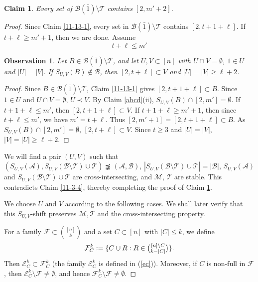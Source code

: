 \documentclass[10pt,a4paper]{amsart}
\newtheorem{claim}{Claim}
\newtheorem{obser}{Observation}
\def\andrey#1{{\sc Andrey: }{\marrow\sf \textcolor{blue}{#1}}}
\newcommand{\m}{\mathcal}
\def\marrow{{\boldmath {\marginpar[\hfill$\rightarrow \rightarrow$]{$\leftarrow \leftarrow$}}}}
\begin{document}
\begin{claim}\label{11-19-1}
Every set of $\mathcal{B}(\bar{1})\setminus \mathcal{T}$ contains $[2, m'+2]$.
\end{claim}

\begin{proof} 
Since Claim \ref{11-13-1}, every set in $\m B(\bar1) \setminus \m T$ contains $[2,t+1+\ell]$. 
If $t+\ell\ge m'+1$, then we are done. Assume 
\[
t+\ell\le m'
\]

\begin{obser}\label{obser3}
Let $B \in \m B(\bar1) \setminus \m T$, and let $U,V\subset [n]$ with $U\cap V=\emptyset$, $1\in U$ and $|U|=|V|$. If  $S_{U,V}(B)\not\in \m B$, then $[2,t+\ell]\subset V$ and $|U|=|V|\ge \ell+2$. 
\end{obser}

\begin{proof}
Since $B \in \m B(\bar1) \setminus \m T$, Claim \ref{11-13-1} gives $[2,t+1+\ell]\subset B$. 
Since $1\in U$ and $U\cap V=\emptyset$, $U\prec V$. 
By Claim \ref{abcd}(ii), $S_{U,V}(B)\cap [2,m']=\emptyset$.
If $t+1+\ell\le m'$, then $[2,t+1+\ell]\subset V$. 
If $t+1+\ell\ge m'+1$, then since $t+\ell \le m'$, we have $m'=t+\ell$. Thus $[2,m'+1]=[2,t+1+\ell]\subset B$.
As $S_{U,V}(B)\cap [2,m']=\emptyset$, $[2, t+\ell]\subset V$. Since $t\ge 3$ and $|U|=|V|$, $|V|=|U|\ge \ell+2$.
\end{proof}

We will find a pair $(U,V)$ such that $(S_{U,V}(\m A), S_{U,V}(\m B\setminus \m T)\cup \m T)\precneqq (\m A, \m B)$, $|S_{U,V}(\m B\setminus \m T)\cup \m T|=|\m B|$,
$S_{U,V}(\m A)$ and $S_{U,V}(\m B\setminus \m T)\cup \m T$ are cross-intersecting, and $\m M $, $\m T$ are stable. This contradicts Claim \ref{11-3-4}, thereby completing the proof of Claim \ref{11-19-1}. 

We choose $U$ and $V$ according to the following cases.  
We shall later verify that this $S_{U,V}$-shift preserves $\m M, \m T$ and the cross-intersecting property.

For a family $\m F\subset {[n]\choose k}$ and a set $C\subset [n]$ with $|C|\le k$, we define
\begin{equation}\label{fc}
    \mathcal{F}^k_C:=\{C\cup R: R\in \tbinom{[n]\setminus C}{ k-|C|}\}.
\end{equation}
Then $\mathcal{E}^k_C\subset \mathcal{F}^k_C$ (the family $\mathcal{E}^k_C$ is defined in (\ref{ec})). Moreover, if $C$ is non-full in $\m F$, then $\mathcal{E}^k_C\setminus \m F \ne \emptyset$, and hence
$\mathcal{F}^k_C\setminus \m F \ne \emptyset$. %


\end{proof}
\end{document}
